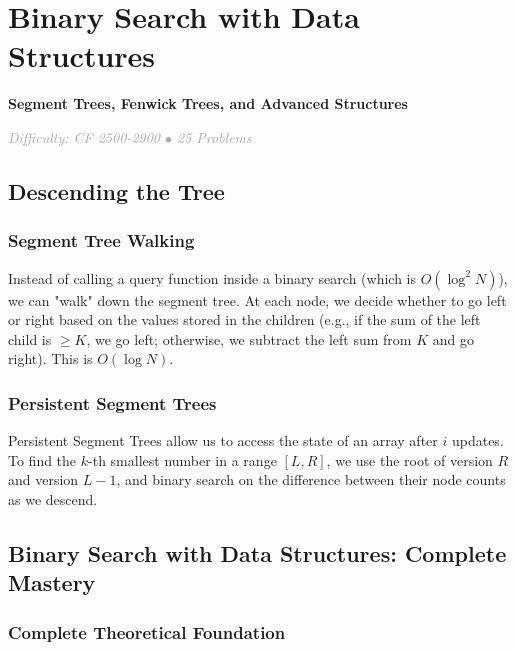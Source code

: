 \documentclass[11pt,a4paper,oneside]{book}
\begin{document}
\chapter{Binary Search with Data Structures}

\begin{tcolorbox}[
    enhanced,
    colback=white,
    colframe=secondaryblue,
    boxrule=1pt,
    arc=2mm,
    left=10pt,
    right=10pt
]
\textbf{\large\textcolor{primaryblue}{Segment Trees, Fenwick Trees, and Advanced Structures}}
\end{tcolorbox}

\vspace{0.5cm}

\begin{center}
\textit{\textcolor{darkgray}{Difficulty: CF 2500-2900 $\bullet$ 25 Problems}}
\end{center}

\section{Descending the Tree}

\subsection{Segment Tree Walking}
Instead of calling a query function inside a binary search (which is $O(\log^2 N)$), we can "walk" down the segment tree. At each node, we decide whether to go left or right based on the values stored in the children (e.g., if the sum of the left child is $\geq K$, we go left; otherwise, we subtract the left sum from $K$ and go right). This is $O(\log N)$.



\subsection{Persistent Segment Trees}
Persistent Segment Trees allow us to access the state of an array after $i$ updates. To find the $k$-th smallest number in a range $[L, R]$, we use the root of version $R$ and version $L-1$, and binary search on the difference between their node counts as we descend.

\section{Binary Search with Data Structures: Complete Mastery}

\subsection{Complete Theoretical Foundation}
\end{document}
